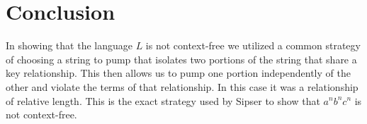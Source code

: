 \documentclass[10pt]{article}
\theoremstyle{definition}
\begin{document}
\section{ Conclusion }

In showing that the language $L$ is not context-free we utilized a common strategy of choosing a string to pump that isolates two portions of the string that share a key relationship. This then allows us to pump one portion independently of the other and violate the terms of that relationship. In this case it was a relationship of relative length. This is the exact strategy used by Sipser to show that $a^{n}b^{n}c^{n}$ is not context-free. 



\end{document}
